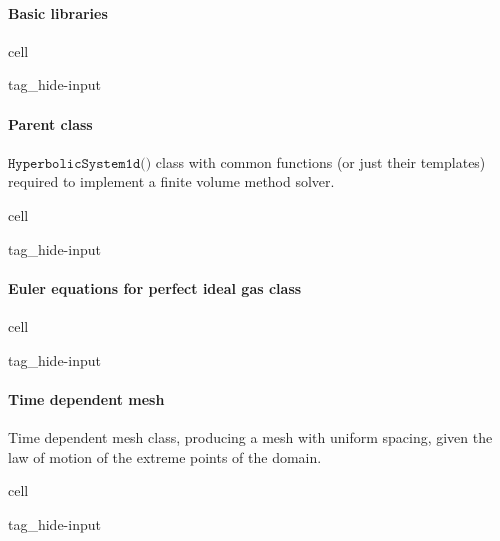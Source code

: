 \documentclass[letterpaper,10pt,english]{jupyterBook}
\begin{document}
\paragraph{Basic libraries}
\label{\detokenize{ch/pde/euler-1d-ale-piston:basic-libraries}}
\begin{sphinxuseclass}{cell}
\begin{sphinxuseclass}{tag_hide-input}
\end{sphinxuseclass}
\end{sphinxuseclass}

\paragraph{Parent class}
\label{\detokenize{ch/pde/euler-1d-ale-piston:parent-class}}
\sphinxAtStartPar
\(\texttt{HyperbolicSystem1d()}\) class with common functions (or just their templates) required to implement a finite volume method solver.

\begin{sphinxuseclass}{cell}
\begin{sphinxuseclass}{tag_hide-input}
\end{sphinxuseclass}
\end{sphinxuseclass}

\paragraph{Euler equations for perfect ideal gas class}
\label{\detokenize{ch/pde/euler-1d-ale-piston:euler-equations-for-perfect-ideal-gas-class}}
\begin{sphinxuseclass}{cell}
\begin{sphinxuseclass}{tag_hide-input}
\end{sphinxuseclass}
\end{sphinxuseclass}

\paragraph{Time dependent mesh}
\label{\detokenize{ch/pde/euler-1d-ale-piston:time-dependent-mesh}}
\sphinxAtStartPar
Time dependent mesh class, producing a mesh with uniform spacing, given the law of motion of the extreme points of the domain.

\begin{sphinxuseclass}{cell}
\begin{sphinxuseclass}{tag_hide-input}
\end{sphinxuseclass}
\end{sphinxuseclass}
\end{document}
